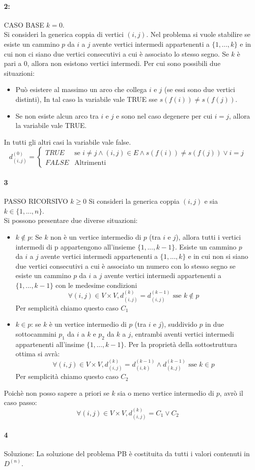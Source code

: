 \documentclass[12pt, a4paper, openany]{book}
\begin{document}
\paragraph*{2:} CASO BASE $k=0$.
\\Si consideri la generica coppia di vertici $(i,j)$.
Nel problema si vuole stabilire se esiste un cammino $p$ da $i$ a $j$ avente vertici intermedi appartenenti a $\{1,...,k\}$ e in cui non ci siano due vertici consecutivi a cui è associato lo stesso segno.
Se $k$ è pari a 0, allora non esistono vertici intermedi.
Per cui sono possibili due situazioni:
\begin{itemize}
	\item Può esistere al massimo un arco che collega $i$ e $j$ (se essi sono due vertici distinti), In tal caso la variabile vale TRUE sse $s(f(i))\neq s(f(j))$.
	\item Se non esiste alcun arco tra $i$ e $j$ e sono nel caso degenere per cui $i=j$, allora la variabile vale TRUE.
\end{itemize}
In tutti gli altri casi la variabile vale false.
$$d^{(0)}_{(i,j)}= \begin{cases}
	TRUE & \text{se } i\neq j \wedge (i,j)\in E \wedge s(f(i)) \neq s(f(j)) \vee i=j \\
	FALSE & \text{Altrimenti}
\end{cases}
$$
\paragraph*{3} PASSO RICORSIVO $k\geq 0$
Si consideri la generica coppia $(i,j)$ e sia $k\in\{1,...,n\}$.
\\Si possono presentare due diverse situazioni:
\begin{itemize}
	\item $k\notin p$: Se $k$ non è un vertice intermedio di $p$ (tra $i$ e $j$), allora tutti i vertici intermedi di p appartengono all'insieme $\{1,...,k-1\}$.
	Esiste un cammino $p$ da $i$ a $j$ avente vertici intermedi appartenenti a $\{1,...,k\}$ e in cui non si siano due vertici consecutivi a cui è associato un numero con lo stesso segno se esiste
	un cammino $p$ da $i$ a $j$ avente vertici intermedi appartenenti a $\{1,...,k-1\}$ con le medesime condizioni
	$$\forall(i,j)\in V\times V, d^{(k)}_{(i,j)} = d^{(k-1)}_{(i,j)} \text{ sse } k\notin p$$
	Per semplicità chiamo questo caso $C_1$
	\item$k\in p$: se $k$ è un vertice intermedio di $p$ (tra $i$ e $j$), suddivido $p$ in due sottocammini $p_1$ da $i$ a $k$ e $p_2$ da $k$ a $j$,
	entrambi aventi vertici intermedi appartenenti all'insime $\{1,...,k-1\}$.
	Per la proprietà della sottostruttura ottima si avrà:
	$$\forall(i,j)\in V\times V, d^{(k)}_{(i,j)} = d^{(k-1)}_{(i,k)} \wedge d^{(k-1)}_{(k,j)} \text{ sse } k\in p$$
	Per semplicità chiamo questo caso $C_2$
\end{itemize}
Poichè non posso sapere a priori se $k$ sia o meno vertice intermedio di $p$, avrò il caso passo:
$$\forall(i,j)\in V\times V, d^{(k)}_{(i,j)} = C_1 \vee C_2$$
\paragraph*{4}Soluzione:
La soluzione del problema PB è costituita da tutti i valori contenuti in $D^{(n)}$.
\end{document}
